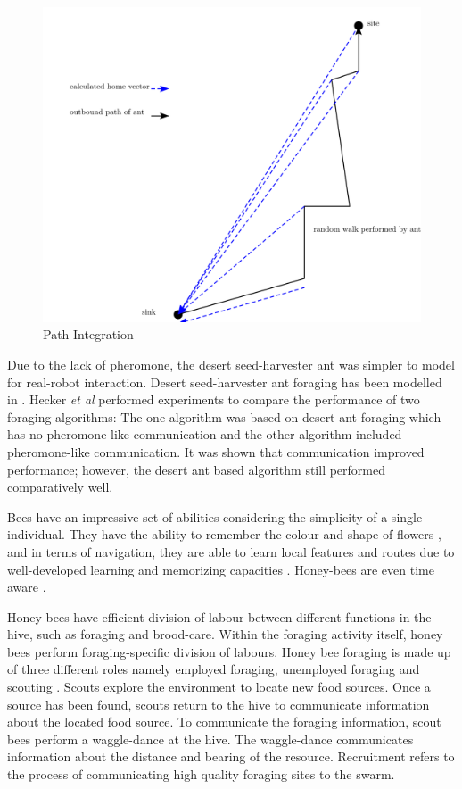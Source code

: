 \documentclass[preprint,12pt]{elsarticle}
\begin{document}
\begin{figure} [h]
	\centering
	\includegraphics[width=\textwidth/2]{figures/drawing.png}
	\caption{Path Integration}
	\label{pathintegration}
\end{figure}

Due to the lack of pheromone, the desert seed-harvester ant was simpler to model for real-robot interaction. Desert seed-harvester ant foraging has been modelled in \cite{moller1998modeling,hecker2012formica}. Hecker \textit{et al} \cite{hecker2012formica} performed experiments to compare the performance of two foraging algorithms: The one algorithm was based on desert ant foraging which has no pheromone-like communication and the other algorithm included pheromone-like communication. It was shown that communication improved performance; however, the desert ant based algorithm still performed comparatively well. 

Bees have an impressive set of abilities considering the simplicity of a single individual. They have the ability to remember the colour and shape of flowers \cite{zhang2006honeybee}, and in terms of navigation, they are able to learn local features and routes due to well-developed learning and memorizing capacities \cite{menzel2001cognitive}. Honey-bees are even time aware \cite{moore1989influence}. 

Honey bees have efficient division of labour between different functions in the hive, such as foraging and brood-care. Within the foraging activity itself, honey bees perform foraging-specific division of labours. Honey bee foraging is made up of three different roles namely employed foraging, unemployed foraging and scouting \cite{seeley2009wisdom}. Scouts explore the environment to locate new food sources. Once a source has been found, scouts return to the hive to communicate information about the located food source. To communicate the foraging information, scout bees perform a waggle-dance at the hive. The waggle-dance communicates information about the distance and bearing of the resource. Recruitment \cite{seeley2009wisdom} refers to the process of communicating high quality foraging sites to the swarm.
\end{document}
